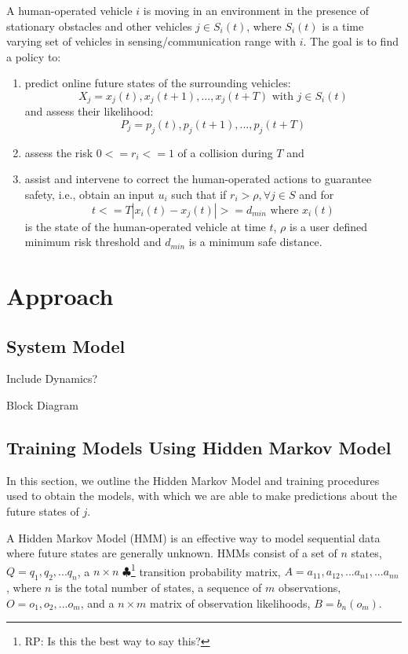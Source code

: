 \documentclass[conference]{IEEEtran}
\newcommand\RP[1]{$\clubsuit$\footnote{RP: #1}}
\begin{document}
    A human-operated vehicle $i$ is moving in an environment in the presence of stationary obstacles and other vehicles $j \in S_i(t)$, where $S_i(t)$ is a time varying set of vehicles in sensing/communication range with $i$. The goal is to find a policy to:
    \begin{enumerate}
        \item  predict online future states of the surrounding vehicles:
    \begin{equation}
    X_j={x_j(t), x_j(t+1),..., x_j(t+T)} \text{ with } j \in S_i(t)
    \end{equation}
    and assess their likelihood:
    \begin{equation}
    P_j={p_j(t), p_j(t+1),..., p_j(t+T)}
    \end{equation}
    \item assess the risk $0<= r_i <=1$ of a collision during $T$ and
    \item assist and intervene to correct the human-operated actions to guarantee safety, i.e., obtain an input $u_i$ such that if $r_i>\rho, \forall j \in S$ and for 
    \begin{equation}
    t<=T |x_i(t)-x_j(t)|>=d_{min} \text{ where } x_i(t)
    \end{equation}
    is the state of the human-operated vehicle at time $t$, $\rho$ is a user defined minimum risk threshold and $d_{min}$ is a minimum safe distance.

    \end{enumerate}

\section{Approach}


\subsection{System Model}
Include Dynamics? 

Block Diagram

\subsection{Training Models Using Hidden Markov Model}
In this section, we outline the Hidden Markov Model and training procedures used to obtain the models, with which we are able to make predictions about the future states of $j$.

A Hidden Markov Model (HMM) is an effective way to model sequential data where future states are generally unknown. HMMs consist of a set of $n$ states, $Q = q_1,q_2,...q_n$, a $n\times n$ \RP{Is this the best way to say this?} transition probability matrix, $A = a_{11},a_{12},...a_{n1},...a_{nn}$, where $n$ is the total number of states, a sequence of $m$ observations, $O = o_1,o_2,...o_m$, and a $n\times m$ matrix of observation likelihoods, $B = b_n(o_m)$. 
\end{document}
